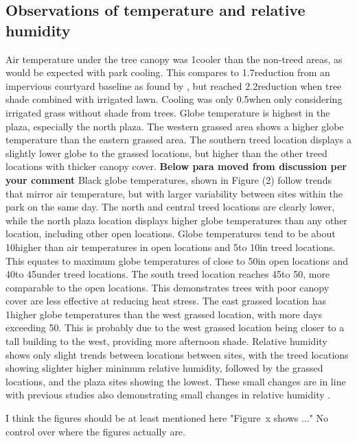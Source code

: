 \documentclass[twocolumn, a4paper]{article}
\providecommand{\comment}[1]{{\large\bf #1}}
\begin{document}
\subsection{Observations of temperature and relative humidity}
Air temperature under the tree canopy was 1\celsius cooler than the non-treed areas, as would be expected with park cooling. This compares to 1.7\kelvin reduction from an impervious courtyard baseline as found by \cite{SHASHUABAR2009179}, but reached 2.2\kelvin reduction when tree shade combined with irrigated lawn. Cooling was only 0.5\kelvin when only considering irrigated grass without shade from trees. Globe temperature is highest in the plaza, especially the north plaza. The western grassed area shows a higher globe temperature than the eastern grassed area. The southern treed location displays a slightly lower globe to the grassed locations, but higher than the other treed locations with thicker canopy cover.
\comment{Below para moved from discussion per your comment}
Black globe temperatures, shown in Figure (2) follow trends that mirror air temperature, but with larger variability between sites within the park on the same day. The north and central treed locations are clearly lower, while the north plaza location displays higher globe temperatures than any other location, including other open locations. Globe temperatures tend to be about 10\celsius higher than air temperatures in open locations and 5\celsius to 10\celsius in treed locations. This equates to maximum globe temperatures of close to 50\celsius in open locations and 40\celsius to 45\celsius under treed locations. The south treed location reaches 45\celsius to 50\celsius, more comparable to the open locations. This demonstrates trees with poor canopy cover are less effective at reducing heat stress. The east grassed location has 1\celsius higher globe temperatures than the west grassed location, with more days exceeding 50\celsius. This is probably due to the west grassed location being closer to a tall building to the west, providing more afternoon shade.
Relative humidity shows only slight trends between locations between sites, with the treed locations showing slighter higher minimum relative humidity, followed by the grassed locations, and the plaza sites showing the lowest. These small changes are in line with previous studies also demonstrating small changes in relative humidity \cite{RN1128} \cite{SHASHUABAR2009179}.


I think the figures
should be at least mentioned here "Figure~x shows ..." No control over where the figures actually are. 
\end{document}
